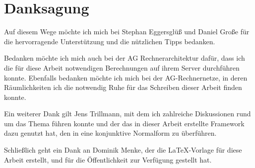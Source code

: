 \section*{Danksagung}

Auf diesem Wege möchte ich mich bei Stephan Eggersglüß und Daniel Große für die hervorragende Unterstützung und die nützlichen Tipps bedanken.

Bedanken möchte ich mich auch bei der AG Rechnerarchitektur dafür, dass ich die für diese Arbeit notwendigen Berechnungen auf ihrem Server durchführen konnte.
Ebenfalls bedanken möchte ich mich bei der AG-Rechnernetze, in deren Räumlichkeiten ich die notwendig Ruhe für das Schreiben dieser Arbeit finden konnte.

Ein weiterer Dank gilt Jens Trillmann, mit dem ich zahlreiche Diskussionen rund um das Thema führen konnte und der das in dieser Arbeit erstellte
Framework dazu genutzt hat, den  in eine konjunktive Normalform zu überführen.

Schließlich geht ein Dank an Dominik Menke, der die LaTeX-Vorlage für diese Arbeit erstellt, und für die Öffentlichkeit zur Verfügung gestellt hat.
